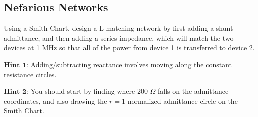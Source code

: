 \documentclass{article}
\begin{document}
\vfill

\subsection{Nefarious Networks}
Using a Smith Chart, design a L-matching network by first adding a shunt admittance, and then adding a series impedance, which will match the two devices at 1 MHz so that all of the power from device 1 is transferred to device 2. 
\vspace{3mm}

$\textbf{Hint 1:}$ Adding/subtracting reactance involves moving along the constant resistance circles.


\vspace{3mm}

$\textbf{Hint 2:}$ You should start by finding where 200 $\Omega$ falls on the admittance coordinates, and also drawing the $r = 1$ normalized admittance circle on the Smith Chart.

\vfill
\end{document}

